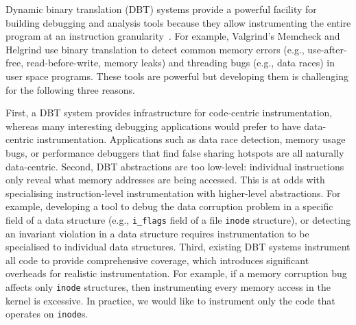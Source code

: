 \documentclass[letterpaper,twocolumn,10pt]{article}
\begin{document}
Dynamic binary translation (DBT) systems provide a powerful facility for building debugging and analysis tools because they allow instrumenting the entire program at an instruction granularity~\cite{DynamoRIOKernel}. For example, Valgrind's Memcheck \cite{Seward:2005:UVD:1247360.1247362} and Helgrind \cite{Muehlenfeld:2007:FDM:1229428.1229457} use binary translation to detect common memory errors (e.g., use-after-free, read-before-write, memory leaks) and threading bugs (e.g., data races) in user space programs. These tools are powerful but developing them is challenging for the following three reasons.

First, a DBT system provides infrastructure for code-centric instrumentation, whereas many interesting debugging applications would prefer to have data-centric instrumentation. Applications such as data race detection, memory usage bugs, or performance debuggers that find false sharing hotspots are all naturally data-centric. 
Second, DBT abstractions are too low-level: individual instructions only reveal what memory addresses are being accessed. This is at odds with specialising instruction-level instrumentation with higher-level abstractions. For example, developing a tool to debug the data corruption problem in a specific field of a data structure (e.g., \texttt{i\_flags} field of a file \texttt{inode} structure), or detecting an invariant violation in a data structure requires instrumentation to be specialised to individual data structures.
Third, existing DBT systems instrument all code to provide comprehensive coverage, which introduces significant overheads for realistic instrumentation. For example, if a memory corruption bug affects only \texttt{inode} structures, then instrumenting every memory access in the kernel is excessive. In practice, we would like to instrument only the code that operates on \texttt{inode}s.
\end{document}

